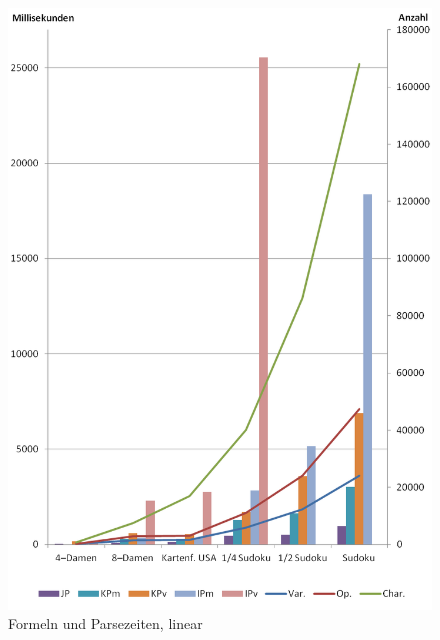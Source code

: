 \documentclass[ngerman,a4paper,abstracton,open=right,twoside=false,toc=listofnumbered,bibtotocnumbered]{scrreprt}
\begin{document}
\begin{figure}[!ht]
	\begin{center}
		\includegraphics[scale=0.85]{img/linear}
	\end{center}
	\caption{\label{parse-linear}Formeln und Parsezeiten, linear}
\end{figure}
\end{document}
